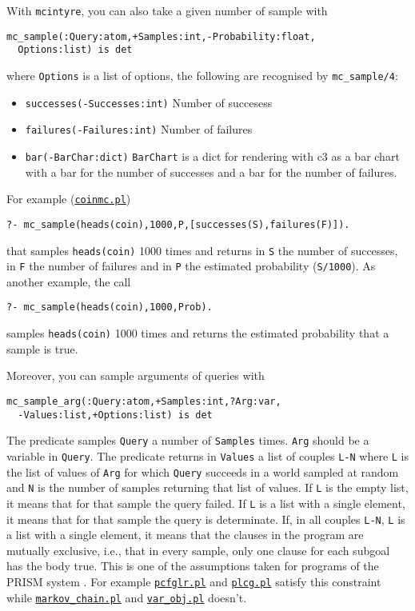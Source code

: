 With \verb|mcintyre|, you can also take a given number of sample with
\begin{verbatim}
mc_sample(:Query:atom,+Samples:int,-Probability:float,
  Options:list) is det
\end{verbatim}
where
\verb|Options| is a list of options, the following are recognised by \verb|mc_sample/4|:
\begin{itemize}
\item \verb|successes(-Successes:int)|
Number of succesess
\item \verb|failures(-Failures:int)|
Number of failures
\item \verb|bar(-BarChar:dict)|
\verb|BarChart| is a dict for rendering with c3 as a bar chart with
a bar for the number of successes and a bar for the number
of failures.
\end{itemize}
For example (\href{http://cplint.eu/example/inference/coinmc.pl}{\texttt{coinmc.pl}})
\begin{verbatim}
?- mc_sample(heads(coin),1000,P,[successes(S),failures(F)]).
\end{verbatim}
that samples \verb|heads(coin)| 1000 times and returns in \verb|S| the number of successes, in \verb|F| the number of failures and in \verb|P| the
estimated probability (\verb|S/1000|).
As another example, the call
\begin{verbatim}
?- mc_sample(heads(coin),1000,Prob).
\end{verbatim}
samples \verb|heads(coin)| 1000 times and returns the
estimated probability that a sample is true.


Moreover, you can sample arguments of queries with
\begin{verbatim}
mc_sample_arg(:Query:atom,+Samples:int,?Arg:var,
  -Values:list,+Options:list) is det
\end{verbatim}
The predicate samples \verb|Query| a number of \verb|Samples| times.
\verb|Arg| should be a variable in \verb|Query|.
The predicate returns in \verb|Values| a list of couples \verb|L-N| where
\verb|L| is the list of values of \verb|Arg| for which \verb|Query|
succeeds in a world sampled at random and \verb|N|
is the number of samples returning that list of values.
If \verb|L| is the empty list, it means that for that
sample the query failed.
If \verb|L| is a list with a
single element, it means that for that sample the query is
determinate.
If, in all couples \verb|L-N|, \verb|L|
is a list with a
single element, it means that the clauses in the program
are mutually exclusive, i.e., that in every sample, only
one clause for each subgoal has the body true. This is one
of the assumptions taken for programs of the PRISM system \cite{DBLP:journals/jair/SatoK01}.
For example
\href{http://cplint.eu/example/inference/pcfglr.pl}{\texttt{pcfglr.pl}} and \href{http://cplint.eu/example/inference/plcg.pl}{\texttt{plcg.pl}} satisfy this constraint while
 \href{http://cplint.eu/example/inference/markov_chain.pl}{\texttt{markov\_chain.pl}} and \href{http://cplint.eu/example/inference/var_obj.pl}{\texttt{var\_obj.pl}} doesn't.

